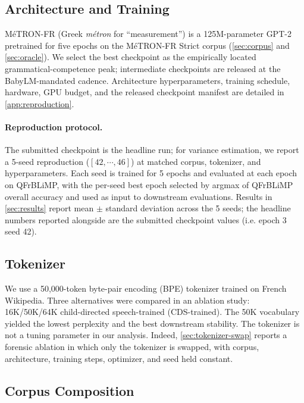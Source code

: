 \documentclass[11pt]{article}
\begin{document}
\subsection{Architecture and Training}
\label{sec:arch}

MéTRON-FR (Greek \emph{métron} for \enquote{measurement}) is a 125M-parameter GPT-2 \citep{radford2019gpt2} pretrained for five epochs on the MéTRON-FR Strict corpus (\autoref{sec:corpus} and \autoref{sec:oracle}). 
We select the best checkpoint as the empirically located grammatical-competence peak; intermediate checkpoints are released at the BabyLM-mandated cadence. Architecture hyperparameters, training schedule, hardware, GPU budget, and the released checkpoint manifest are detailed in \autoref{app:reproduction}.

\paragraph{Reproduction protocol.} The submitted checkpoint is the headline run; for variance estimation, we report a 5-seed reproduction ($[42, \cdots, 46]$) at matched corpus, tokenizer, and hyperparameters. Each seed is trained for 5 epochs and evaluated at each epoch on QFrBLiMP, with the per-seed best epoch selected by argmax of QFrBLiMP overall accuracy and used as input to downstream evaluations. 
Results in \autoref{sec:results} report mean $\pm$ standard deviation across the 5 seeds; the headline numbers reported alongside are the submitted checkpoint values (i.e. epoch 3 seed 42).

\subsection{Tokenizer}
\label{sec:tokenizer}

We use a 50{,}000-token byte-pair encoding (BPE) \citep{sennrich2016bpe} tokenizer trained on French Wikipedia. Three alternatives were compared in an ablation study: 16K/50K/64K child-directed speech-trained (CDS-trained). 
The 50K vocabulary yielded the lowest perplexity and the best downstream stability. 
The tokenizer is not a tuning parameter in our analysis. 
Indeed, \autoref{sec:tokenizer-swap} reports a forensic ablation in which only the tokenizer is swapped, with corpus, architecture, training steps, optimizer, and seed held constant.

\subsection{Corpus Composition}
\label{sec:corpus}
\end{document}

